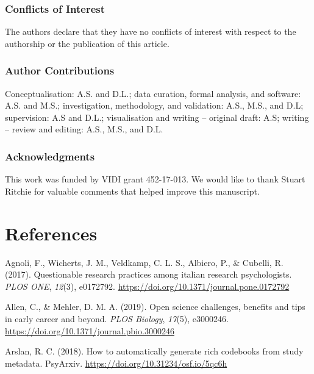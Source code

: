 \documentclass[british,,man,floatsintext]{apa6}
\begin{document}
\hypertarget{conflicts-of-interest}{%
\subsubsection{Conflicts of Interest}\label{conflicts-of-interest}}

The authors declare that they have no conflicts of interest with respect to the authorship or the publication of this article.

\hypertarget{author-contributions}{%
\subsubsection{Author Contributions}\label{author-contributions}}

Conceptualisation: A.S. and D.L.; data curation, formal analysis, and software: A.S. and M.S.; investigation, methodology, and validation: A.S., M.S., and D.L; supervision: A.S and D.L.; visualisation and writing -- original draft: A.S; writing -- review and editing: A.S., M.S., and D.L.

\hypertarget{acknowledgments}{%
\subsubsection{Acknowledgments}\label{acknowledgments}}

This work was funded by VIDI grant 452-17-013. We would like to thank Stuart Ritchie for valuable comments that helped improve this manuscript.

\hypertarget{references}{%
\section{References}\label{references}}

\setlength{\parindent}{-0.5in}
\setlength{\leftskip}{0.5in}

\hypertarget{refs}{}
\leavevmode\hypertarget{ref-Agnoli2017}{}%
Agnoli, F., Wicherts, J. M., Veldkamp, C. L. S., Albiero, P., \& Cubelli, R. (2017). Questionable research practices among italian research psychologists. \emph{PLOS ONE}, \emph{12}(3), e0172792. \url{https://doi.org/10.1371/journal.pone.0172792}

\leavevmode\hypertarget{ref-Allen2019}{}%
Allen, C., \& Mehler, D. M. A. (2019). Open science challenges, benefits and tips in early career and beyond. \emph{PLOS Biology}, \emph{17}(5), e3000246. \url{https://doi.org/10.1371/journal.pbio.3000246}

\leavevmode\hypertarget{ref-R-codebook}{}%
Arslan, R. C. (2018). How to automatically generate rich codebooks from study metadata. PsyArxiv. \url{https://doi.org/10.31234/osf.io/5qc6h}
\end{document}
